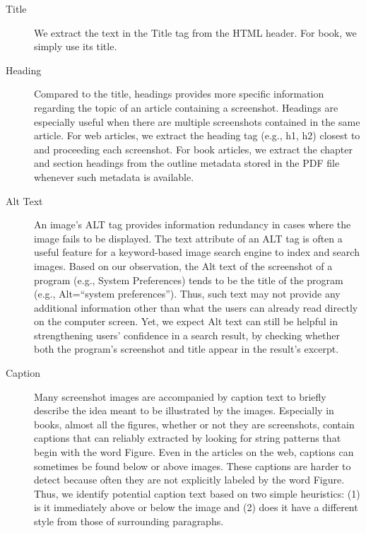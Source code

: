 \documentclass{www2010-submission}
\begin{document}
\begin{description}

\item[Title] We extract the text in the Title tag from the HTML
  header. For book, we simply use its title.

\item[Heading] Compared to the title, headings provides more specific
  information regarding the topic of an article containing a
  screenshot. Headings are especially useful when there are multiple
  screenshots contained in the same article. For web articles, we
  extract the heading tag (e.g., h1, h2) closest to and proceeding each
  screenshot. For book articles, we extract the chapter and section
  headings from the outline metadata stored in the PDF file whenever
  such metadata is available.

\item[Alt Text] An image's ALT tag provides information redundancy in
  cases where the image fails to be displayed. The text attribute of an
  ALT tag is often a useful feature for a keyword-based image search
  engine to index and search images. Based on our observation, the Alt
  text of the screenshot of a program (e.g., System Preferences) tends
  to be the title of the program (e.g., Alt=``system preferences'').
  Thus, such text may not provide any additional information other
  than what the users can already read directly on the computer
  screen. Yet, we expect Alt text can still be helpful in
  strengthening users' confidence in a search result, by checking
  whether both the program's screenshot and title appear in the
  result's excerpt.

\item[Caption] Many screenshot images are accompanied by caption text
  to briefly describe the idea meant to be illustrated by the images.
  Especially in books, almost all the figures, whether or not they are
  screenshots, contain captions that can reliably extracted by looking
  for string patterns that begin with the word Figure.  Even in the
  articles on the web, captions can sometimes be found below or above
  images. These captions are harder to detect because often they are
  not explicitly labeled by the word Figure. Thus, we identify
  potential caption text based on two simple heuristics: (1) is it
  immediately above or below the image and (2) does it have a
  different style from those of surrounding paragraphs.


\end{description}
\end{document}

